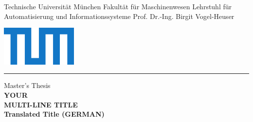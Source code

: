 \begin{titlepage}
	\begin{center}
%
%	
	\begin{minipage}[c]{9cm}
		\small
		Technische Universität München\newline
		Fakultät für Maschinenwesen\newline
		Lehrstuhl für Automatisierung und Informationssysteme\newline
		Prof. Dr.-Ing. Birgit Vogel-Heuser
	\end{minipage}
	\begin{minipage}[c]{6cm}
		\centering \includegraphics[height=2.0cm]{Figures/TUM_Logo_cmyk.pdf}
	\end{minipage}
%
%
%		
%		

	\rule{0.95\textwidth}{0.3mm}
	
	\vspace{1.0cm}
		
	\LARGE
	Master's Thesis
	\\[1cm]
	\huge
	\textbf{YOUR\\MULTI-LINE TITLE}\\
	\vspace{0.8cm}
	\huge
	\textbf{Translated Title (GERMAN)}
	\end{center}
	

\end{titlepage}
